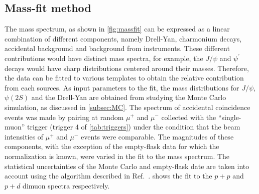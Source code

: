 \documentclass[reprint,aps,unsortedaddress,superscriptaddress,prc,floatfix,showpacs,linenumbers,final]{revtex4-2}
\begin{document}
\subsection{Mass-fit method}
The mass spectrum, as shown in \cref{fig:massfit} can be expressed as a linear combination of different components,
namely Drell-Yan, charmonium decays, accidental background and background from instruments.
These different contributions would have distinct mass spectra, for example, the $J/\psi$
and $\psi^\prime$ decays would have sharp distributions centered around their masses.
Therefore, the data can be fitted to various templates to obtain
the relative contribution from each sources. 
As input parameters to the fit, the mass distributions for $J/\psi$, $\psi\left(2S\right)$ 
and the Drell-Yan are obtained from studying the Monte Carlo simulation, as discussed in \cref{subsec:MC}.
The spectrum of accidental coincidence events was made by pairing at random $\mu^+$ and $\mu^-$ collected with the ``single-muon'' trigger (trigger 4 of \cref{tab:triggers})
under the condition that the beam intensities of $\mu^+$ and $\mu^-$ events were comparable.
The magnitudes of these components,
with the exception of the empty-flask data for which the normalization is known,
were varied in the fit to the mass spectrum.
The statistical uncertainties of the Monte Carlo and empty-flask date are taken into account using the algorithm described in Ref.~\cite{barlow1993}.
 shows the fit to the $p+p$ and $p+d$ dimuon spectra respectively.
\end{document}
